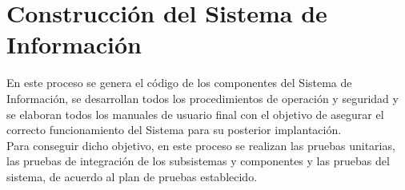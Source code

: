 \rhead{\newtitle}
\cfoot{\thepage}
\renewcommand{\headrulewidth}{1pt}
\renewcommand{\footrulewidth}{1pt}

\chapter{Construcción del Sistema de Información}\label{ch_5}
\noindent En este proceso se genera el código de los componentes del Sistema de Información, se desarrollan todos los procedimientos de operación y seguridad y se elaboran todos los manuales de usuario final con el objetivo de asegurar el correcto funcionamiento del Sistema para su posterior implantación.\\

\noindent Para conseguir dicho objetivo, en este proceso se realizan las pruebas unitarias, las pruebas de integración de los subsistemas y componentes y las pruebas del sistema, de acuerdo al plan de pruebas establecido.
\newpage



